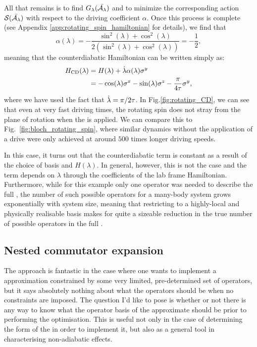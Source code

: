     All that remains is to find $G_{\lambda}(\Bar{\mathcal{A}_{\lambda}})$ and to minimize the corresponding action $\mathcal{S}(\Bar{\mathcal{A}_{\lambda}})$ with respect to the driving coefficient $\alpha$. Once this process is complete (see Appendix \ref{app:rotating_spin_hamiltonian} for details), we find that
    \begin{equation}\label{eq:rotating_spin_alpha}
        \alpha(\lambda) = -\frac{\sin^2(\lambda) + \cos^2(\lambda)}{2(\sin^2(\lambda) + \cos^2(\lambda))} = - \frac{1}{2},
    \end{equation}
    meaning that the counterdiabatic Hamiltonian can be written simply as:
    \begin{equation}\label{eq:rotating_spin_HCD}
        \begin{aligned}
            H_{\rm CD}(\lambda) &= H(\lambda) + \dot{\lambda} \alpha(\lambda) \sigma^y \\
            &= -\cos(\lambda)\sigma^x - \sin(\lambda)\sigma^z - \frac{\pi}{4 \tau} \sigma^y,
        \end{aligned}
    \end{equation}
    where we have used the fact that $\dot{\lambda} = \pi/2\tau$. In Fig.\ref{fig:rotating_CD}, we can see that even at very fast driving times, the rotating spin does not stray from the plane of rotation when the  is applied. We can compare this to Fig.~\ref{fig:bloch_rotating_spin}, where similar dynamics without the application of a  drive were only achieved at around $500$ times longer driving speeds.
    
    In this case, it turns out that the counterdiabatic term is constant as a result of the choice of basis and $H(\lambda)$. In general, however, this is not the case and the  term depends on $\lambda$ through the coefficients of the lab frame Hamiltonian. Furthermore, while for this example only one operator was needed to describe the full , the number of such possible operators for a many-body system grows exponentially with system size, meaning that restricting to a highly-local and physically realisable basis makes for quite a sizeable reduction in the true number of possible operators in the full .
    
    \subsection{Nested commutator expansion}\label{sec:2.4.2_nested_commutators}

    The  approach is fantastic in the case where one wants to implement a  approximation constrained by some very limited, pre-determined set of operators, but it says absolutely nothing about what the operators should be when no constraints are imposed. The question I'd like to pose is whether or not there is any way to know what the operator basis of the approximate  should be prior to performing the optimisation. This is useful not only in the case of determining the form of the  in order to implement it, but also as a general tool in characterising non-adiabatic effects.

